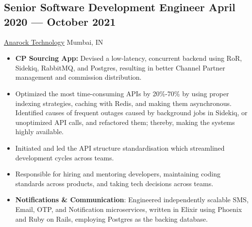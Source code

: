 \documentclass[a4,10pt]{article}
\newcommand{\subtext}[1]{
#1\par\vspace{-0.2cm}}
\newenvironment{zitemize}{
\begin{itemize}\itemsep0pt \parskip0pt \parsep1pt}
{\end{itemize}\vspace{-0.5cm}}
\begin{document}
\subsection*{Senior Software Development Engineer \hfill April 2020 --- October 2021} 
\subtext{\href{https://tech.anarock.com/}{Anarock Technology} \hfill Mumbai, IN} 
    \begin{zitemize}

        \item {\bf CP Sourcing App: } Devised a low-latency, concurrent backend using RoR, Sidekiq, RabbitMQ, and Postgres, resulting in better Channel Partner management and commission distribution.
        \item Optimized the most time-consuming APIs by 20\%-70\% by using proper indexing strategies, caching with Redis, and making them asynchronous. Identified causes of frequent outages caused by background jobs in Sidekiq, or unoptimized API calls, and refactored them; thereby, making the systems highly available.
        \item Initiated and led the API structure standardisation which streamlined development cycles across teams.
        \item Responsible for hiring and mentoring developers, maintaining coding standards across products, and taking tech decisions across teams.
        \item {\bf Notifications \& Communication}: Engineered independently scalable SMS, Email, OTP, and Notification microservices, written in Elixir using Phoenix and Ruby on Rails, employing Postgres as the backing database.
    \end{zitemize}

\end{document}
